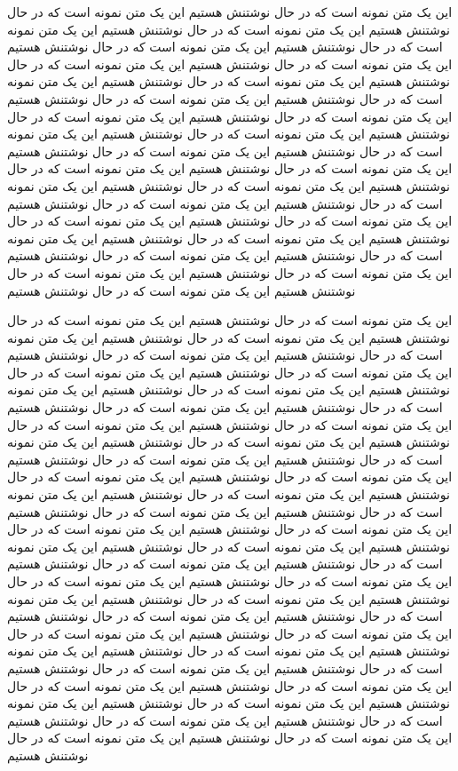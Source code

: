 \documentclass[a4paper,12pt,twoside]{book}
\begin{document}
این یک متن نمونه است که در حال نوشتنش هستیم  این یک متن نمونه است که در حال نوشتنش هستیم این یک متن نمونه است که در حال نوشتنش هستیم این یک متن نمونه است که در حال نوشتنش هستیم این یک متن نمونه است که در حال نوشتنش هستیم این یک متن نمونه است که در حال نوشتنش هستیم این یک متن نمونه است که در حال نوشتنش هستیم
این یک متن نمونه است که در حال نوشتنش هستیم  این یک متن نمونه است که در حال نوشتنش هستیم این یک متن نمونه است که در حال نوشتنش هستیم این یک متن نمونه است که در حال نوشتنش هستیم این یک متن نمونه است که در حال نوشتنش هستیم این یک متن نمونه است که در حال نوشتنش هستیم این یک متن نمونه است که در حال نوشتنش هستیم
این یک متن نمونه است که در حال نوشتنش هستیم  این یک متن نمونه است که در حال نوشتنش هستیم این یک متن نمونه است که در حال نوشتنش هستیم این یک متن نمونه است که در حال نوشتنش هستیم این یک متن نمونه است که در حال نوشتنش هستیم این یک متن نمونه است که در حال نوشتنش هستیم این یک متن نمونه است که در حال نوشتنش هستیم
این یک متن نمونه است که در حال نوشتنش هستیم  این یک متن نمونه است که در حال نوشتنش هستیم این یک متن نمونه است که در حال نوشتنش هستیم این یک متن نمونه است که در حال نوشتنش هستیم این یک متن نمونه است که در حال نوشتنش هستیم این یک متن نمونه است که در حال نوشتنش هستیم این یک متن نمونه است که در حال نوشتنش هستیم

\pagebreak

این یک متن نمونه است که در حال نوشتنش هستیم  این یک متن نمونه است که در حال نوشتنش هستیم این یک متن نمونه است که در حال نوشتنش هستیم این یک متن نمونه است که در حال نوشتنش هستیم این یک متن نمونه است که در حال نوشتنش هستیم این یک متن نمونه است که در حال نوشتنش هستیم این یک متن نمونه است که در حال نوشتنش هستیم
این یک متن نمونه است که در حال نوشتنش هستیم  این یک متن نمونه است که در حال نوشتنش هستیم این یک متن نمونه است که در حال نوشتنش هستیم این یک متن نمونه است که در حال نوشتنش هستیم این یک متن نمونه است که در حال نوشتنش هستیم این یک متن نمونه است که در حال نوشتنش هستیم این یک متن نمونه است که در حال نوشتنش هستیم
این یک متن نمونه است که در حال نوشتنش هستیم  این یک متن نمونه است که در حال نوشتنش هستیم این یک متن نمونه است که در حال نوشتنش هستیم این یک متن نمونه است که در حال نوشتنش هستیم این یک متن نمونه است که در حال نوشتنش هستیم این یک متن نمونه است که در حال نوشتنش هستیم این یک متن نمونه است که در حال نوشتنش هستیم
این یک متن نمونه است که در حال نوشتنش هستیم  این یک متن نمونه است که در حال نوشتنش هستیم این یک متن نمونه است که در حال نوشتنش هستیم این یک متن نمونه است که در حال نوشتنش هستیم این یک متن نمونه است که در حال نوشتنش هستیم این یک متن نمونه است که در حال نوشتنش هستیم این یک متن نمونه است که در حال نوشتنش هستیم
این یک متن نمونه است که در حال نوشتنش هستیم  این یک متن نمونه است که در حال نوشتنش هستیم این یک متن نمونه است که در حال نوشتنش هستیم این یک متن نمونه است که در حال نوشتنش هستیم این یک متن نمونه است که در حال نوشتنش هستیم این یک متن نمونه است که در حال نوشتنش هستیم این یک متن نمونه است که در حال نوشتنش هستیم
این یک متن نمونه است که در حال نوشتنش هستیم  این یک متن نمونه است که در حال نوشتنش هستیم این یک متن نمونه است که در حال نوشتنش هستیم این یک متن نمونه است که در حال نوشتنش هستیم این یک متن نمونه است که در حال نوشتنش هستیم این یک متن نمونه است که در حال نوشتنش هستیم این یک متن نمونه است که در حال نوشتنش هستیم
\end{document}
